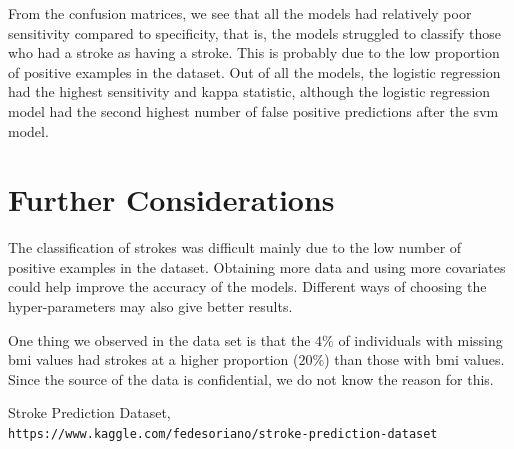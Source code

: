 \documentclass{article}
\begin{document}
From the confusion matrices, we see that all the models had relatively poor sensitivity compared to specificity, that is, the models struggled to classify those who had a stroke as having a stroke. This is probably due to the low proportion of positive examples in the dataset. Out of all the models, the logistic regression had the highest sensitivity and kappa statistic, although the logistic regression model had the second highest number of false positive predictions after the svm model.  

\section{Further Considerations}
The classification of strokes was difficult mainly due to the low number of positive examples in the dataset. Obtaining more data and using more covariates could help improve the accuracy of the models. Different ways of choosing the hyper-parameters may also give better results.

One thing we observed in the data set is that the $4\%$ of individuals with missing bmi values had strokes at a higher proportion ($20\%$) than those with bmi values. Since the source of the data is confidential, we do not know the reason for this.

\begin{thebibliography}{9}

Stroke Prediction Dataset,
\\\texttt{https://www.kaggle.com/fedesoriano/stroke-prediction-dataset}
\end{thebibliography}
\end{document}
